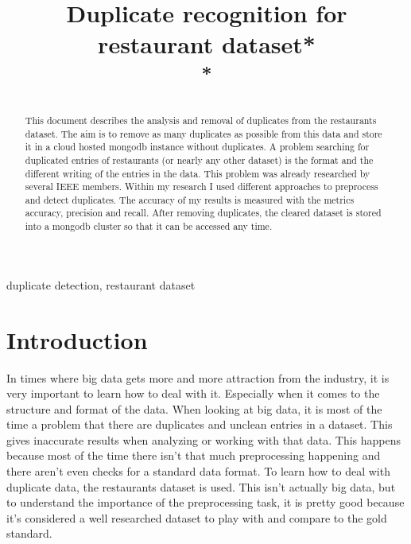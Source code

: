 \documentclass[conference]{IEEEtran}
\begin{document}
\title{Duplicate recognition for restaurant dataset*\\
	{\footnotesize \textsuperscript{*}}
}
\author{
}


\maketitle

\begin{abstract}
This document describes the analysis and removal of duplicates from the restaurants dataset\cite{bib:dataset}. The aim is to remove as many duplicates as possible from this data and store it in a cloud hosted mongodb instance without duplicates. A problem searching for duplicated entries of restaurants (or nearly any other dataset) is the format and the different writing of the entries in the data. This problem was already researched by several IEEE members\cite{bib:foreign_research}. Within my research I used different approaches to preprocess and detect duplicates. The accuracy of my results is measured with the metrics accuracy, precision and recall. After removing duplicates, the cleared dataset is stored into a mongodb cluster so that it can be accessed any time.
\end{abstract}

\begin{IEEEkeywords}
duplicate detection, restaurant dataset
\end{IEEEkeywords}

\section{Introduction}
In times where big data gets more and more attraction from the industry, it is very important to learn how to deal with it. Especially when it comes to the structure and format of the data. When looking at big data, it is most of the time a problem that there are duplicates and unclean entries in a dataset. This gives inaccurate results when analyzing or working with that data. This happens because most of the time there isn't that much preprocessing happening and there aren't even checks for a standard data format. To learn how to deal with duplicate data, the restaurants dataset is used. This isn't actually big data, but to understand the importance of the preprocessing task, it is pretty good because it's considered a well researched dataset to play with and compare to the gold standard. 
\end{document}
